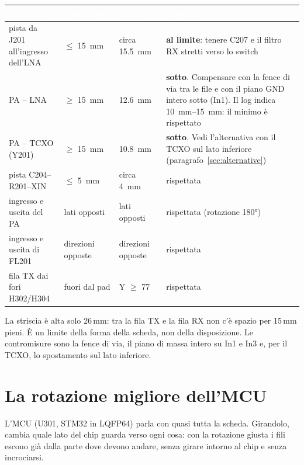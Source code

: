 \documentclass[a4paper,11pt]{article}
\newcommand{\tabhead}{\rowcolor{sbblue}}
\newcommand{\hd}[1]{\textcolor{white}{\sffamily\bfseries\footnotesize #1}}
\begin{document}
{\small
{}
\begin{xltabular}{\linewidth}{@{}L{48mm}L{22mm}L{22mm}Y@{}}
\tabhead\hd{Distanza}&\hd{Consigliata}&\hd{Ottenuta}&\hd{Giudizio}\\
\endhead
pista da J201 all'ingresso dell'LNA & $\le$ \SI{15}{mm} & circa \SI{15.5}{mm} & \textbf{al limite}: tenere C207 e il filtro RX stretti verso lo switch\\
PA -- LNA & $\ge$ \SI{15}{mm} & \SI{12.6}{mm} & \textcolor{sbred}{\textbf{sotto}}. Compensare con la fence di via tra le file e con il piano GND intero sotto (In1). Il log indica \SIrange{10}{15}{mm}: il minimo è rispettato\\
PA -- TCXO (Y201) & $\ge$ \SI{15}{mm} & \SI{10.8}{mm} & \textcolor{sbred}{\textbf{sotto}}. Vedi l'alternativa con il TCXO sul lato inferiore (paragrafo~\ref{sec:alternative})\\
pista C204--R201--XIN & $\le$ \SI{5}{mm} & circa \SI{4}{mm} & rispettata\\
ingresso e uscita del PA & lati opposti & lati opposti & rispettata (rotazione \ang{180})\\
ingresso e uscita di FL201 & direzioni opposte & direzioni opposte & rispettata\\
fila TX dai fori H302/H304 & fuori dal pad & Y $\ge$ 77 & rispettata\\
\bottomrule
\end{xltabular}}

\begin{attenzione}
La striscia è alta solo 26\,mm: tra la fila TX e la fila RX non c'è spazio per 15\,mm pieni. È un limite della forma della scheda, non della disposizione. Le contromisure sono la fence di via, il piano di massa intero su In1 e In3 e, per il TCXO, lo spostamento sul lato inferiore.
\end{attenzione}

\section{La rotazione migliore dell'MCU}
\label{sec:mcu}
L'MCU (U301, STM32 in LQFP64) parla con quasi tutta la scheda. Girandolo, cambia quale lato del chip guarda verso ogni cosa: con la rotazione giusta i fili escono già dalla parte dove devono andare, senza girare intorno al chip e senza incrociarsi.
\end{document}
